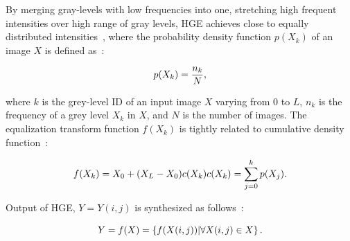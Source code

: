 \documentclass[conference]{IEEEtran}
\begin{document}
\iffalse
By merging gray-levels with low frequencies into one, stretching high frequent intensities over high range of gray levels, HGE achieves close to equally distributed intensities~\cite{90}, where the probability density function $p(X_{k})$ of an image $X$ is defined as~\cite{90}:

\begin{equation}
\scriptsize{
    p(X_{k})=\frac{n_{k}}{N},}
    \label{eq3.1}
\end{equation}

\noindent where $k$ is the grey-level ID of an input image $X$ varying from 0 to $L$, $n_{k}$ is the frequency of a grey level $X_{k}$ in $X$, and $N$ is the number of images. 
The equalization transform function $f(X_{k})$ is tightly related to cumulative density function~\cite{90}:

\begin{equation}
\scriptsize{
    f(X_{k})=X_{0}+(X_{L}-X_{0})c(X_{k}) \\
    c(X_{k})=\sum_{j=0}^{k}p(X_{j}).}
\end{equation}

\noindent Output of HGE, $Y={Y(i,j)}$ is synthesized as follows~\cite{90}:

\begin{equation}
\scriptsize{
    Y=f(X)=\left\{f(X(i,j))|\forall X(i,j) \in X\right\}.}
\end{equation}  

\end{document}
